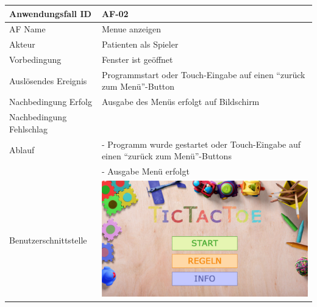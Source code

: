\documentclass[12pt]{article}
\begin{document}
\begin{tabularx}{\textwidth}{|l|X|} \hline
Anwendungsfall ID&AF-02\\ \hline
AF Name&Menue anzeigen\\ \hline
Akteur&Patienten als Spieler\\ \hline
Vorbedingung&Fenster ist geöffnet\\ \hline
Auslösendes Ereignis&Programmstart oder Touch-Eingabe auf einen "`zurück zum Menü"'-\Gls{Button}\\ \hline
Nachbedingung Erfolg&Ausgabe des Menüs erfolgt auf Bildschirm\\ \hline
Nachbedingung Fehlschlag& \\ \hline
Ablauf&- Programm wurde gestartet oder Touch-Eingabe auf einen "`zurück zum Menü"'-\Glspl{Button}\\&- Ausgabe Menü erfolgt \\ \hline
Benutzerschnittstelle&\includegraphics[scale=0.33]{Menu.pdf} \\ \hline
\end{tabularx}\\
\end{document}
